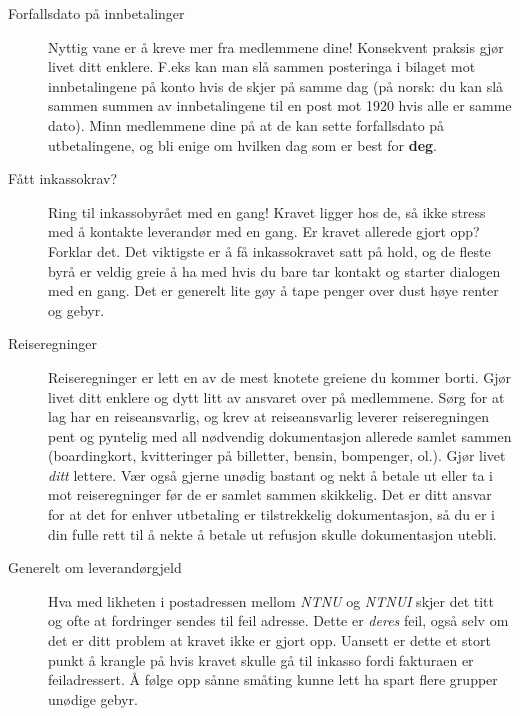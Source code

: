 \begin{description}
\item [Forfallsdato på innbetalinger] Nyttig vane er å kreve mer fra medlemmene dine! Konsekvent praksis gjør livet ditt enklere. F.eks kan man slå sammen posteringa i bilaget mot innbetalingene på konto hvis de skjer på samme dag (på norsk: du kan slå sammen summen av innbetalingene til en post mot 1920 hvis alle er samme dato). Minn medlemmene dine på at de kan sette forfallsdato på utbetalingene, og bli enige om hvilken dag som er best for {\bfseries deg}.
\item[Fått inkassokrav?] Ring til inkassobyrået med en gang! Kravet ligger hos de, så ikke stress med å kontakte leverandør med en gang. Er kravet allerede gjort opp? Forklar det. Det viktigste er å få inkassokravet satt på hold, og de fleste byrå er veldig greie å ha med hvis du bare tar kontakt og starter dialogen med en gang. Det er generelt lite gøy å tape penger over dust høye renter og gebyr.
\item[Reiseregninger] Reiseregninger er lett en av de mest knotete greiene du kommer borti. Gjør livet ditt enklere og dytt litt av ansvaret over på medlemmene. Sørg for at lag har en reiseansvarlig, og krev at reiseansvarlig leverer reiseregningen pent og pyntelig med all nødvendig dokumentasjon allerede samlet sammen (boardingkort, kvitteringer på billetter, bensin, bompenger, ol.). Gjør livet \emph{ditt} lettere. Vær også gjerne unødig bastant og nekt å betale ut eller ta i mot reiseregninger før de er samlet sammen skikkelig. Det er ditt ansvar for at det for enhver utbetaling er tilstrekkelig dokumentasjon, så du er i din fulle rett til å nekte å betale ut refusjon skulle dokumentasjon utebli.
\item[Generelt om leverandørgjeld] Hva med likheten i postadressen mellom \emph{NTNU} og \emph{NTNUI} skjer det titt og ofte at fordringer sendes til feil adresse. Dette er \emph{deres} feil, også selv om det er ditt problem at kravet ikke er gjort opp. Uansett er dette et stort punkt å krangle på hvis kravet skulle gå til inkasso fordi fakturaen er feiladressert. Å følge opp sånne småting kunne lett ha spart flere grupper unødige gebyr.
\end{description}

